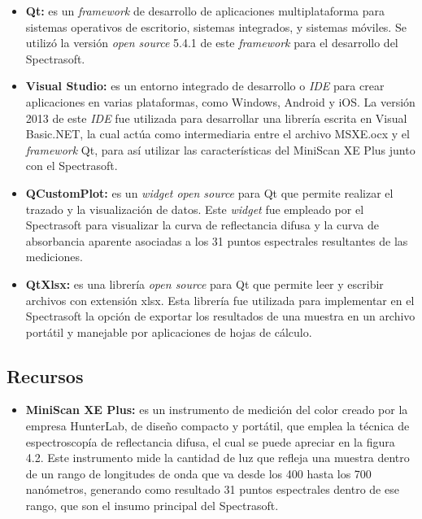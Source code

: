 		\begin{itemize}
			
			\item \textbf{Qt:} es un \textit{framework} de desarrollo de aplicaciones multiplataforma para sistemas operativos de escritorio, sistemas integrados, y sistemas m\'{o}viles. Se utiliz\'{o} la versi\'{o}n \textit{open source} 5.4.1 de este \textit{framework} para el desarrollo del Spectrasoft.
			
			\item \textbf{Visual Studio:} es un entorno integrado de desarrollo o \textit{IDE} para crear aplicaciones en varias plataformas, como Windows, Android y iOS. La versi\'{o}n 2013 de este \textit{IDE} fue utilizada para desarrollar una librer\'{i}a escrita en Visual Basic.NET, la cual act\'{u}a como intermediaria entre el archivo MSXE.ocx y el \textit{framework} Qt, para as\'{i} utilizar las caracter\'{i}sticas del MiniScan XE Plus junto con el Spectrasoft.
			
			\item \textbf{QCustomPlot:} es un \textit{widget open source} para Qt que permite realizar el trazado y la visualizaci\'{o}n de datos. Este \textit{widget} fue empleado por el Spectrasoft para visualizar la curva de reflectancia difusa y la curva de absorbancia aparente asociadas a los 31 puntos espectrales resultantes de las mediciones.
			
			\item \textbf{QtXlsx:} es una librer\'{i}a \textit{open source} para Qt que permite leer y escribir archivos con extensi\'{o}n xlsx. Esta librer\'{i}a fue utilizada para implementar en el Spectrasoft la opci\'{o}n de exportar los resultados de una muestra en un archivo port\'{a}til y manejable por aplicaciones de hojas de c\'{a}lculo.
		\end{itemize}
	
	\subsection{Recursos}
	
		\begin{itemize}
		
			\item \textbf{MiniScan XE Plus:} es un instrumento de medici\'{o}n del color creado por la empresa HunterLab, de dise\~{n}o compacto y port\'{a}til, que emplea la t\'{e}cnica de espectroscop\'{i}a de reflectancia difusa, el cual se puede apreciar en la figura 4.2. Este instrumento mide la cantidad de luz que refleja una muestra dentro de un rango de longitudes de onda que va desde los 400 hasta los 700 nan\'{o}metros, generando como resultado 31 puntos espectrales dentro de ese rango, que son el insumo principal del Spectrasoft.
			
		\end{itemize}
		
